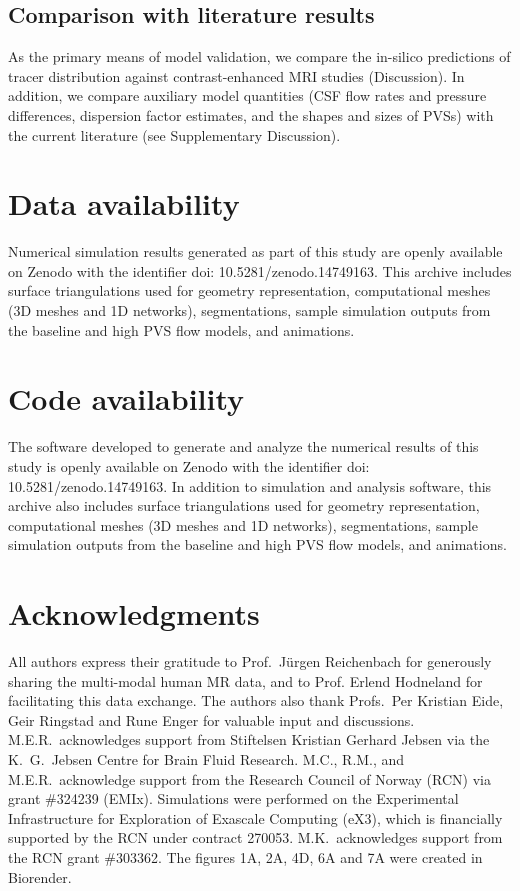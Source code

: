 \documentclass[fleqn,10pt]{wlscirep}
\begin{document}
\subsection*{Comparison with literature results}

As the primary means of model validation, we compare the in-silico
predictions of tracer distribution against contrast-enhanced MRI
studies (Discussion). In addition, we compare auxiliary model
quantities (CSF flow rates and pressure differences, dispersion factor
estimates, and the shapes and sizes of PVSs) with the current
literature (see Supplementary Discussion).

\section*{Data availability}

Numerical simulation results generated as part of this study are
openly available on Zenodo with the identifier doi:
10.5281/zenodo.14749163. This archive includes surface triangulations
used for geometry representation, computational meshes (3D meshes and
1D networks), segmentations, sample simulation outputs from the
baseline and high PVS flow models, and animations.

\section*{Code availability}

The software developed to generate and analyze the numerical results
of this study is openly available on Zenodo with the identifier doi:
10.5281/zenodo.14749163. In addition to simulation and analysis
software, this archive also includes surface triangulations used for
geometry representation, computational meshes (3D meshes and 1D
networks), segmentations, sample simulation outputs from the baseline
and high PVS flow models, and animations. 



\section*{Acknowledgments}

All authors express their gratitude to Prof.~Jürgen Reichenbach for
generously sharing the multi-modal human MR data, and to Prof. Erlend
Hodneland for facilitating this data exchange. The authors also thank
Profs.~Per Kristian Eide, Geir Ringstad and Rune Enger for valuable
input and discussions. M.E.R.~acknowledges support from Stiftelsen
Kristian Gerhard Jebsen via the K.~G.~Jebsen Centre for Brain Fluid
Research. M.C., R.M., and M.E.R.~acknowledge support from the Research
Council of Norway (RCN) via grant \#324239 (EMIx). Simulations were
performed on the Experimental Infrastructure for Exploration of
Exascale Computing (eX3), which is financially supported by the RCN
under contract 270053. M.K.~acknowledges support from the RCN grant
\#303362. The figures 1A, 2A, 4D, 6A and 7A were created in
Biorender.
\end{document}
